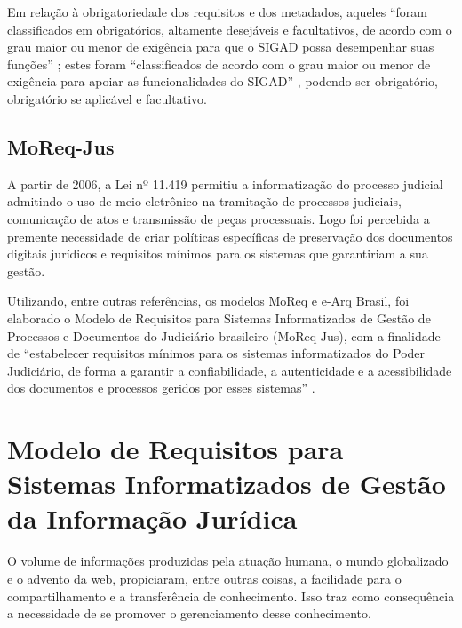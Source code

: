 \documentclass[a4paper,11pt,openright,twoside,brazil]{abntex2}
\begin{document}
Em relação à obrigatoriedade dos requisitos e dos metadados, aqueles ``foram
classificados em obrigatórios, altamente desejáveis e facultativos, de acordo
com o grau maior ou menor de exigência para que o SIGAD possa desempenhar suas
funções'' \cite[p.~16]{conarq2009}; estes foram ``classificados de acordo com o
grau maior ou menor de exigência para apoiar as funcionalidades do SIGAD''
\cite[p.~16]{conarq2009}, podendo ser obrigatório, obrigatório se aplicável e
facultativo.

\section{MoReq-Jus}

A partir de 2006, a Lei nº 11.419 permitiu a informatização do processo judicial
admitindo o uso de meio eletrônico na tramitação de processos judiciais,
comunicação de atos e transmissão de peças processuais. Logo foi percebida a
premente necessidade de criar políticas específicas de preservação dos
documentos digitais jurídicos e requisitos mínimos para os sistemas que
garantiriam a sua gestão.

Utilizando, entre outras referências, os modelos MoReq e e-Arq Brasil, foi
elaborado o Modelo de Requisitos para Sistemas Informatizados de Gestão de
Processos e Documentos do Judiciário brasileiro (MoReq-Jus), com a finalidade de
``estabelecer requisitos mínimos para os sistemas informatizados do Poder
Judiciário, de forma a garantir a confiabilidade, a autenticidade e a
acessibilidade dos documentos e processos geridos por esses sistemas''
\cite[p.~5]{cnj2009}.



\chapter{Modelo de Requisitos para Sistemas Informatizados de Gestão da 
Informação Jurídica}


 
O volume de informações produzidas pela atuação humana, o mundo globalizado e o
advento da web, propiciaram, entre outras coisas, a facilidade para o
compartilhamento e a transferência de conhecimento.
Isso traz como consequência a necessidade de se promover o gerenciamento desse
conhecimento.
\end{document}
